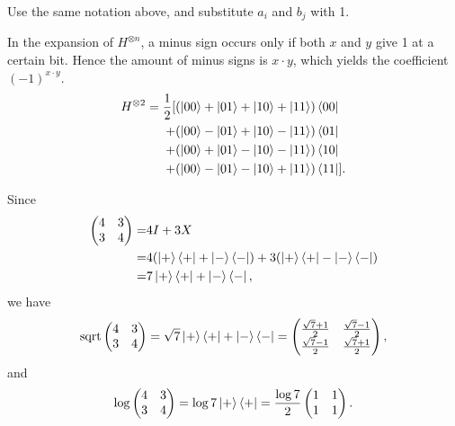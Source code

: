 \ex Use the same notation above, and substitute $a_i$ and $b_j$ with 1.

\ex In the expansion of $H^{\otimes n}$, a minus sign occurs only if both $x$ and $y$ give 1 at a certain bit.
Hence the amount of minus signs is $x\cdot y$, which yields the coefficient $(-1)^{x\cdot y}$.
$$\begin{aligned}H^{\otimes 2}=\frac{1}{2}[
    &(\left|00\right\rangle+\left|01\right\rangle+\left|10\right\rangle+\left|11\right\rangle)\left\langle00\right|
    \\+&(\left|00\right\rangle-\left|01\right\rangle+\left|10\right\rangle-\left|11\right\rangle)\left\langle01\right|
    \\+&(\left|00\right\rangle+\left|01\right\rangle-\left|10\right\rangle-\left|11\right\rangle)\left\langle10\right|
    \\+&(\left|00\right\rangle-\left|01\right\rangle-\left|10\right\rangle+\left|11\right\rangle)\left\langle11\right|].\end{aligned}$$

\ex Since 
$$\begin{aligned}
    \begin{pmatrix}4&3\\3&4\end{pmatrix} = & 4I+3X 
    \\ = & 4(\left|+\right\rangle\left\langle+\right|+\left|-\right\rangle\left\langle-\right|)+3(\left|+\right\rangle\left\langle+\right|-\left|-\right\rangle\left\langle-\right|) 
    \\ = & 7\left|+\right\rangle\left\langle+\right|+\left|-\right\rangle\left\langle-\right|,
\end{aligned}$$
we have
$$\operatorname{sqrt}\begin{pmatrix}
    4&3\\3&4
\end{pmatrix}=\sqrt{7}\left|+\right\rangle\left\langle+\right|+\left|-\right\rangle\left\langle-\right|=\begin{pmatrix}
    \frac{\sqrt{7}+1}{2}&\frac{\sqrt{7}-1}{2}\\\frac{\sqrt{7}-1}{2}&\frac{\sqrt{7}+1}{2}
\end{pmatrix},$$
and
$$\operatorname{log}\begin{pmatrix}
    4&3\\3&4
\end{pmatrix}=\log{7}\left|+\right\rangle\left\langle+\right|=\frac{\log 7}{2}\begin{pmatrix}
    1&1\\1&1
\end{pmatrix}.$$

